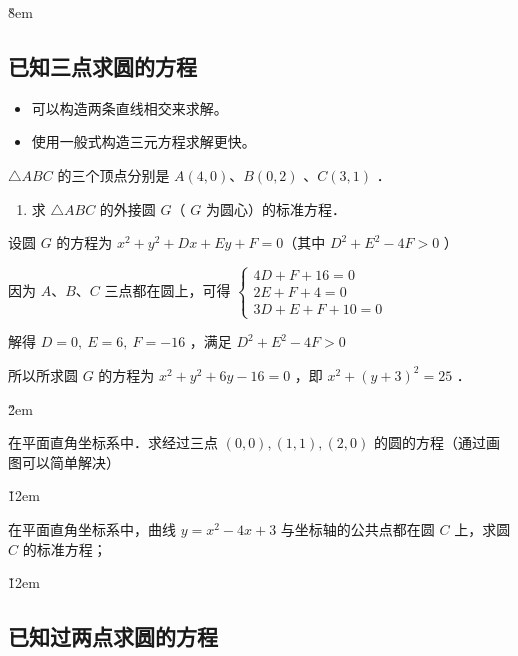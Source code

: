 \v{8em}

\subsection{已知三点求圆的方程}

\begin{theorem}
    \begin{itemize}
        \item 可以构造两条直线相交来求解。
        \item 使用一般式构造三元方程求解更快。
    \end{itemize}
\end{theorem}

\begin{example}
    $\triangle A B C$ 的三个顶点分别是 $A(4,0)$、$B(0,2)$ 、$C(3,1)$ ．
    \begin{enumerate}
        \item 求 $\triangle A B C$ 的外接圆 $G$（ $G$ 为圆心）的标准方程．
    \end{enumerate}
\end{example}

\begin{solution}
    设圆 $G$ 的方程为 $x^2+y^2+D x+E y+F=0$（其中 $D^2+E^2-4 F>0$ ）

    因为 $A$、$B$、$C$ 三点都在圆上，可得 $\left\{\begin{array}{l}4 D+F+16=0 \\ 2 E+F+4=0 \\ 3 D+E+F+10=0\end{array}\right.$

    解得 $D=0, ~ E=6, ~ F=-16$ ，满足 $D^2+E^2-4 F>0$

    所以所求圆 $G$ 的方程为 $x^2+y^2+6 y-16=0$ ，即 $x^2+(y+3)^2=25$ ．
\end{solution}

\v{2em}

\begin{example}
    在平面直角坐标系中．求经过三点 $(0,0),(1,1),(2,0)$ 的圆的方程（通过画图可以简单解决）
\end{example}

\v{12em}

\begin{example}
    在平面直角坐标系中，曲线 $y=x^2-4 x+3$ 与坐标轴的公共点都在圆 $C$ 上，求圆 $C$ 的标准方程；
\end{example}

\v{12em}

\subsection{已知过两点求圆的方程}

